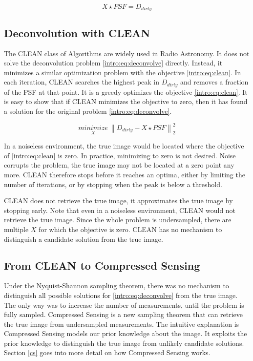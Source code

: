 \begin{equation}\label{intro:eq:deconvolve}
X \star PSF = D_{dirty} 
\end{equation}


\subsection{Deconvolution with CLEAN}
The CLEAN class of Algorithms\cite{hogbom1974aperture}\cite{schwab1984relaxing}\cite{rich2008multi}\cite{rau2011multi} are widely used in Radio Astronomy. It does not solve the deconvolution problem \eqref{intro:eq:deconvolve} directly. Instead, it minimizes a similar optimization problem with the objective  \eqref{intro:eq:clean}. In each iteration, CLEAN searches the highest peak in $D_{dirty}$ and removes a fraction of the PSF at that point. It is a greedy optimizes the objective \eqref{intro:eq:clean}. It is easy to show that if CLEAN minimizes the objective to zero, then it has found a solution for the original problem \eqref{intro:eq:deconvolve}. 

\begin{equation}\label{intro:eq:clean}
\underset{X}{minimize} \: \left \| D_{dirty} - X \star PSF \right \|_2^2
\end{equation}

In a noiseless environment, the true image would be located where the objective of \eqref{intro:eq:clean} is zero. In practice, minimizing to zero is not desired. Noise corrupts the problem, the true image may not be located at a zero point any more. CLEAN therefore stops before it reaches an optima, either by limiting the number of iterations, or by stopping when the peak is below a threshold.

CLEAN does not retrieve the true image, it approximates the true image by stopping early. Note that even in a noiseless environment, CLEAN would not retrieve the true image. Since the whole problem is undersampled, there are multiple $X$ for which the objective is zero. CLEAN has no mechanism to distinguish a candidate solution from the true image.


\subsection{From CLEAN to Compressed Sensing}
Under the Nyquist-Shannon sampling theorem, there was no mechanism to distinguish all possible solutions for \eqref{intro:eq:deconvolve} from the true image. The only way was to increase the number of measurements, until the problem is fully sampled. Compressed Sensing\cite{candes2006robust}\cite{donoho2006compressed} is a new sampling theorem that can retrieve the true image from undersampled measurements. The intuitive explanation is Compressed Sensing models our prior knowledge about the image. It exploits the prior knowledge to distinguish the true image from unlikely candidate solutions. Section \ref{cs} goes into more detail on how Compressed Sensing works.

